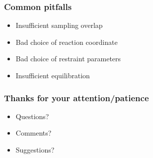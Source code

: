 \documentclass{beamer}
\numberwithin{table}{section}
\numberwithin{figure}{section}
\numberwithin{equation}{section}
\begin{document}
\begin{frame}
\frametitle{Common pitfalls}
    \begin{itemize}
        \item{Insufficient sampling overlap}
        \item{Bad choice of reaction coordinate}
        \item{Bad choice of restraint parameters}
        \item{Insufficient equilibration}
    \end{itemize}
\end{frame}

\begin{frame}
\frametitle{Thanks for your attention/patience}
    \begin{itemize}
        \item{Questions?}
        \item{Comments?}
        \item{Suggestions?}
    \end{itemize}
\end{frame}
\end{document}

